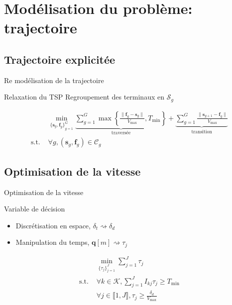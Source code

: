 \section{Modélisation du problème: trajectoire}

\subsection{Trajectoire explicitée}
\begin{frame}{Re modélisation de la trajectoire}
  \begin{block}{Relaxation du TSP}
    Regroupement des terminaux en \( \mathcal{S}_g \)
  \end{block}
  \begin{align}
    & \min_{
        {\{\mathbf{s}_g, \mathbf{f}_g\}}_{g=1}^G
      }
      \underbrace{
      \sum_{g = 1}^G \max \left\{
      \frac{
      \| \mathbf{f}_g - \mathbf{s}_g \|
      }{
      V_{\text{max}}
      }, T_{\text{min}}
      \right\}
      }_{\text{traversée}} +
      \underbrace{
      \sum_{g = 1}^G
      \frac{
      \| \mathbf{s}_{g + 1} - \mathbf{f}_g \|
      }{
      V_{\text{max}}
      }
      }_{\text{transition}} \tag{P4} \\
    \text{s.t. } & \forall g, (\mathbf{s}_g, \mathbf{f}_g) \in \mathcal{C}_g
  \end{align}
\end{frame}

\subsection{Optimisation de la vitesse}
\begin{frame}{Optimisation de la vitesse}
  \begin{block}{Variable de décision}
    \begin{itemize}
    \item Discrétisation en espace, \( \delta_t \rightsquigarrow
      \delta_d \)
    \item Manipulation du temps, \( \mathbf{q}[m] \rightsquigarrow
      \tau_j \)
    \end{itemize}
  \end{block}
  \begin{align}
    & \min_{\{\tau_j\}_{j = 1}^J} \sum_{j = 1}^J \tau_j \tag{P5} \\
    \text{s.t. } & \forall k \in \mathcal{K}, \sum_{j = 1}^J I_{kj}
                   \tau_j \geq T_{\text{min}} \\
    & \forall j \in \llbracket 1, J \rrbracket,
      \tau_j \geq \frac{\delta_d}{V_{\text{max}}}
  \end{align}
\end{frame}